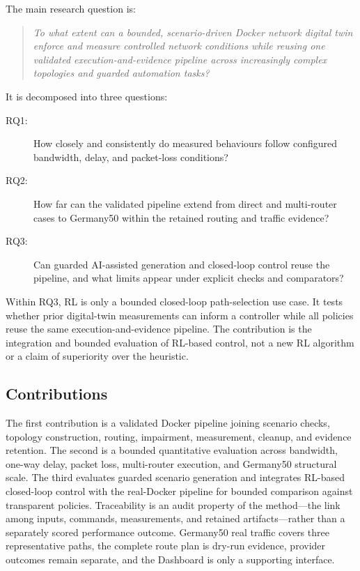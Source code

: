 The main research question is:

\begin{quote}
\emph{To what extent can a bounded, scenario-driven Docker network digital twin enforce and measure controlled network conditions while reusing one validated execution-and-evidence pipeline across increasingly complex topologies and guarded automation tasks?}
\end{quote}

It is decomposed into three questions:

\begin{description}
\item[RQ1:] How closely and consistently do measured behaviours follow configured bandwidth, delay, and packet-loss conditions?
\item[RQ2:] How far can the validated pipeline extend from direct and multi-router cases to Germany50 within the retained routing and traffic evidence?
\item[RQ3:] Can guarded AI-assisted generation and closed-loop control reuse the pipeline, and what limits appear under explicit checks and comparators?
\end{description}

Within RQ3, RL is only a bounded closed-loop path-selection use case. It tests whether prior digital-twin measurements can inform a controller while all policies reuse the same execution-and-evidence pipeline. The contribution is the integration and bounded evaluation of RL-based control, not a new RL algorithm or a claim of superiority over the heuristic.

\subsection{Contributions}

The first contribution is a validated Docker pipeline joining scenario checks, topology construction, routing, impairment, measurement, cleanup, and evidence retention. The second is a bounded quantitative evaluation across bandwidth, one-way delay, packet loss, multi-router execution, and Germany50 structural scale. The third evaluates guarded scenario generation and integrates RL-based closed-loop control with the real-Docker pipeline for bounded comparison against transparent policies. Traceability is an audit property of the method---the link among inputs, commands, measurements, and retained artifacts---rather than a separately scored performance outcome. Germany50 real traffic covers three representative paths, the complete route plan is dry-run evidence, provider outcomes remain separate, and the Dashboard is only a supporting interface.
